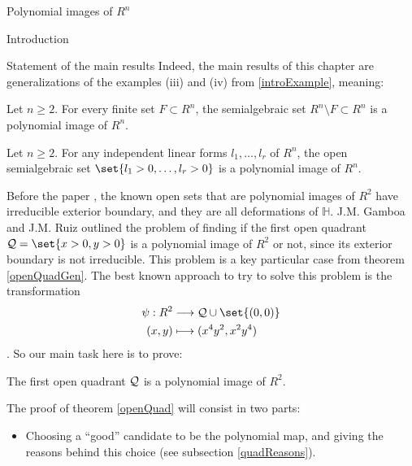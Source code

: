 \documentclass[11pt, a4paper, english, twoside, notitlepage]{report}
\begin{document}
\begin{chapter}{Polynomial images of $R^n$}
\begin{section}{Introduction}
\begin{subsection}{Statement of the main results}
	Indeed, the main results of this chapter are generalizations of the examples (iii) and (iv) from \ref{introExample}, meaning:
	
	\begin{theorem}\label{finSetTh}
		
		Let $n \ge 2$. For every finite set $F\subset R^n$, the semialgebraic set $R^n \setminus F \subset R^n$ is a polynomial image of $R^n$.
		
	\end{theorem}
	
	\begin{theorem}\label{openQuadGen}
		
		Let $n \ge 2$. For any independent linear forms $l_1, \dots, l_r$ of $R^n$, the open semialgebraic set $\set{l_1>0, \dots, l_r>0}$ is a polynomial image of $R^n$.
		
	\end{theorem}
	
	Before the paper \cite{fg}, the known open sets that are polynomial images of $R^2$ have irreducible exterior boundary, and they are all deformations of $\mathbb{H}$. J.M. Gamboa and J.M. Ruiz outlined the problem of finding if the first open quadrant $\Qu = \set{x > 0, y > 0}$ is a polynomial image of $R^2$ or not, since its exterior boundary is not irreducible. This problem is a key particular case from theorem \ref{openQuadGen}. The best known approach to try to solve this problem is the transformation
	\begin{align*}
			\psi: R^2 & \longrightarrow \Qu \cup \set{(0, 0)}\\
			(x,y) & \longmapsto (x^4 y^2,x^2 y^4)
	\end{align*}
	. So our main task here is to prove:
	
	\begin{theorem}\label{openQuad}
		
		The first open quadrant $\mathcal{Q}$ is a polynomial image of $R^2$.
		
	\end{theorem}
	
	The proof of theorem \ref{openQuad} will consist in two parts:
	
	\begin{itemize}
	
		\item Choosing a ``good'' candidate to be the polynomial map, and giving the reasons behind this choice (see subsection \ref{quadReasons}). 
	

\end{itemize}
\end{subsection}
\end{section}
\end{chapter}
\end{document}
